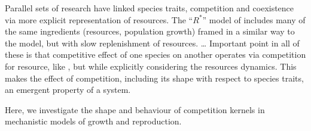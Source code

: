 \documentclass[a4paper,11pt]{article}
\newcommand{\Rstar}{\ensuremath{R^*}}
\begin{document}
%
Parallel sets of research have linked species traits, competition and
coexistence via more explicit representation of resources.
%
The ``\Rstar'' model of \citet{Tilman-1982} includes many of the same
ingredients (resources, population growth) framed in a similar way to
the \citet{MacArthur-1967} model, but with slow replenishment of
resources.
\ldots
%
Important point in all of these is that competitive effect of one
species on another operates via competition for resource, like
\citet{MacArthur-1967}, but while explicitly considering the resources
dynamics.  This makes the effect of competition, including its shape
with respect to species traits, an emergent property of a system.

%
%
Here, we investigate the shape and behaviour of competition kernels in
mechanistic models of growth and reproduction.
\end{document}
